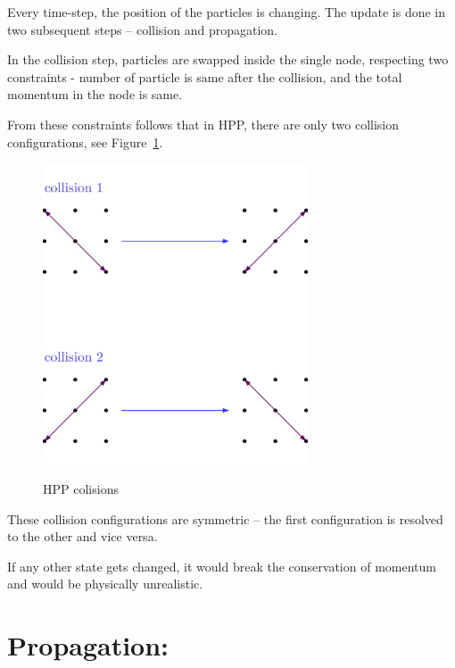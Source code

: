 Every time-step, the position of the particles is changing. The update is done in two subsequent steps -- collision and propagation.

In the collision step, particles are swapped inside the single node, respecting two constraints - number of particle is same after the collision, and the total momentum in the node is same.

From these constraints follows that in HPP, there are only two collision configurations, see Figure~\ref{hpp-colision}.

\begin{figure}[H]
 \centering
 \includegraphics[width=0.7\textwidth]{./img/hpp_col}
 \label{hpp-colision}
 \caption{HPP colisions}
\end{figure}

These collision configurations are symmetric -- the first configuration is resolved to the other and vice versa.

If any other state gets changed, it would break the conservation of momentum and would be physically unrealistic.

\section{Propagation:}

